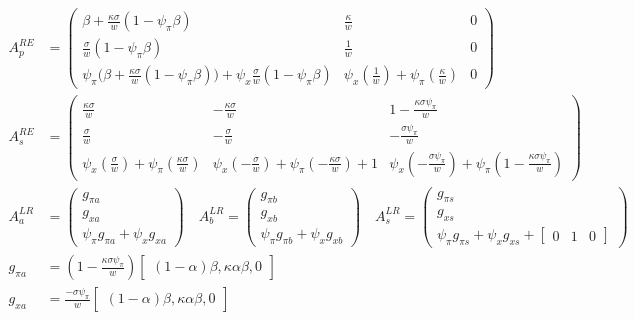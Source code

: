 \documentclass[11pt]{article}
\renewcommand{\[}{\begin{equation}}
\renewcommand{\]}{\end{equation}}
\begin{document}
\begin{align}
A_p^{RE} & = \begin{pmatrix} \beta + \frac{\kappa\sigma}{w} (1-\psi_{\pi}\beta) & \frac{\kappa}{w} & 0\\
 \frac{\sigma}{w} (1-\psi_{\pi}\beta) & \frac{1}{w}& 0\\ 
\psi_{\pi}\big( \beta + \frac{\kappa\sigma}{w} (1-\psi_{\pi}\beta) \big) +\psi_x\frac{\sigma}{w} (1-\psi_{\pi}\beta)&  \psi_x (\frac{1}{w})+ \psi_{\pi} (\frac{\kappa}{w})& 0\end{pmatrix} \quad \\
A_s^{RE} &= \begin{pmatrix}   \frac{\kappa\sigma}{w}  &-\frac{\kappa\sigma}{w}  & 1-\frac{\kappa\sigma\psi_{\pi}}{w}\\
 \frac{ \sigma}{w} &  -\frac{\sigma}{w} & -\frac{\sigma\psi_{\pi}}{w}\\ 
 \psi_x( \frac{\sigma}{w}) + \psi_{\pi}( \frac{\kappa\sigma}{w}) & \psi_x(- \frac{\sigma}{w}) + \psi_{\pi}(- \frac{\kappa\sigma}{w}) +1 &  \psi_x(-\frac{\sigma\psi_{\pi}}{w}) + \psi_{\pi}( 1-\frac{\kappa\sigma\psi_{\pi}}{w})\end{pmatrix}  
\\
A_a^{LR} & = \begin{pmatrix} g_{\pi a} \\ g_{x a} \\ \psi_{\pi}g_{\pi a} + \psi_xg_{x a}
\end{pmatrix}
\quad A_b^{LR} = \begin{pmatrix} g_{\pi b} \\ g_{x b} \\ \psi_{\pi}g_{\pi b} + \psi_xg_{x b}
\end{pmatrix}
 \quad A_s^{LR} = \begin{pmatrix} g_{\pi s} \\ g_{x s} \\ \psi_{\pi}g_{\pi s} + \psi_xg_{x s} + \begin{bmatrix} 0 & 1& 0\end{bmatrix}
\end{pmatrix} \\
g_{\pi a} & =(1-\frac{\kappa\sigma\psi_{\pi}}{w} )  \begin{bmatrix}(1-\alpha)\beta, \kappa\alpha\beta, 0 \end{bmatrix} \\
g_{x a} & =  \frac{-\sigma\psi_{\pi}}{w} \begin{bmatrix}(1-\alpha)\beta, \kappa\alpha\beta, 0 \end{bmatrix}\\

\end{align}
\end{document}
